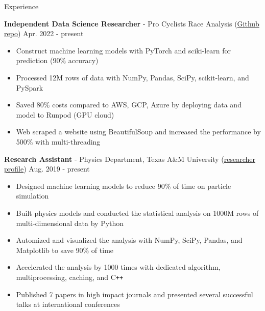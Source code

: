 \documentclass{resume}
\begin{document}
\vspace{-0.25em}
\begin{rSection}{Experience}
    \vspace{-1.5em}
    \item \textbf{Independent Data Science Researcher} - {Pro Cyclists Race Analysis} (\href{https://github.com/noctildon/pro_cyclists}{Github repo}) \hfill Apr. 2022 - present
        \begin{itemize}
        \item Construct machine learning models with PyTorch and sciki-learn for prediction ($90\%$ accuracy)
        \item Processed 12M rows of data with NumPy, Pandas, SciPy, scikit-learn, and PySpark
        \item Saved 80\% costs compared to AWS, GCP, Azure by deploying data and model to Runpod (GPU cloud)
        \item Web scraped a website using BeautifulSoup and increased the performance by 500\% with multi-threading
        \end{itemize}

    \item \textbf{Research Assistant} - Physics Department, Texas A\&M University (\href{https://inspirehep.net/authors/2661451}{researcher profile}) \hfill Aug. 2019 - present
        \begin{itemize}
        \item Designed machine learning models to reduce 90\% of time on particle simulation
        \item Built physics models and conducted the statistical analysis on 1000M rows of multi-dimensional data by Python
        \item Automized and visualized the analysis with NumPy, SciPy, Pandas, and Matplotlib to save 90\% of time
        \item Accelerated the analysis by 1000 times with dedicated algorithm, multiprocessing, caching, and C\texttt{++}
        \item Published 7 papers in high impact journals and presented several successful talks at international conferences
        \end{itemize}


\end{rSection}
\end{document}
